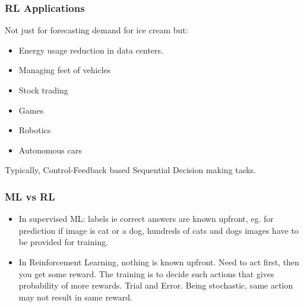 \begin{frame}[fragile]\frametitle{RL Applications}
 Not just for forecasting demand for ice cream but:
\begin{itemize}
\item Energy usage reduction in data centers.
\item Managing feet of vehicles
\item Stock trading
\item Games
\item Robotics
\item Autonomous cars
\end{itemize}

Typically, Control-Feedback based Sequential Decision making tasks.

\end{frame}


\begin{frame}[fragile]\frametitle{ML vs RL}

\begin{itemize}
\item In supervised ML: labels ie correct answers are known upfront, eg. for prediction if image is cat or a dog, hundreds of cats and dogs images have to be provided for training.
\item In Reinforcement Learning,  nothing is known upfront. Need to act first, then you get some reward. The training is to decide such actions that gives probability of more rewards. Trial and Error. Being stochastic, same action may not result in same reward.
\end{itemize}
\end{frame}

